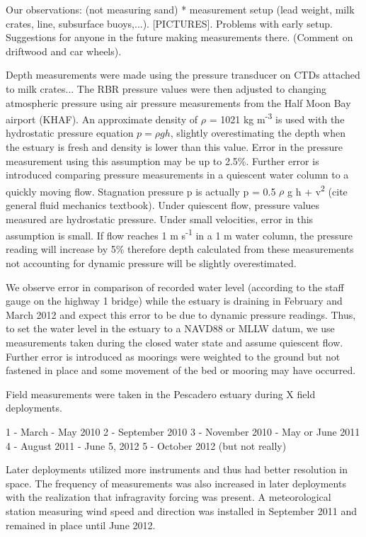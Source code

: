 Our observations: (not measuring sand)
* measurement setup (lead weight, milk crates, line, subsurface buoys,...). [PICTURES]. Problems with early setup. Suggestions for anyone in the future making measurements there. (Comment on driftwood and car wheels). 

Depth measurements were made using the pressure transducer on CTDs attached to milk crates... The RBR pressure values were then adjusted to changing atmospheric pressure using air pressure measurements from the Half Moon Bay airport (KHAF). An approximate density of $\rho$ = 1021 kg m\textsuperscript{-3} is used with the hydrostatic pressure equation ${p = \rho g h}$, slightly overestimating the depth when the estuary is fresh and density is lower than this value. Error in the pressure measurement using this assumption may be up to 2.5\%. Further error is introduced comparing pressure measurements in a quiescent water column to a quickly moving flow. Stagnation pressure p is actually p = 0.5 $\rho$ g h +  v\textsuperscript{2} (cite general fluid mechanics textbook). Under quiescent flow, pressure values measured are hydrostatic pressure. Under small velocities, error in this assumption is small. If flow reaches 1 m s\textsuperscript{-1} in a 1 m water column, the pressure reading will increase by 5\% therefore depth calculated from these measurements not accounting for dynamic pressure will be slightly overestimated.

We observe error in comparison of recorded water level (according to the staff gauge on the highway 1 bridge) while the estuary is draining in February and March 2012 and expect this error to be due to dynamic pressure readings. Thus, to set the water level in the estuary to a NAVD88 or MLLW datum, we use measurements taken during the closed water state and assume quiescent flow.  Further error is introduced as moorings were weighted to the ground but not fastened in place and some movement of the bed or mooring may have occurred. 

Field measurements were taken in the Pescadero estuary during X field deployments. 

1 - March - May 2010
2 - September 2010
3 - November 2010 - May or June 2011
4 - August 2011 - June 5, 2012
5 - October 2012 (but not really)

Later deployments utilized more instruments and thus had better resolution in space.  The frequency of measurements was also increased in later deployments with the realization that infragravity forcing was present. A meteorological station measuring wind speed and direction was installed in {September 2011} and remained in place until June 2012.

